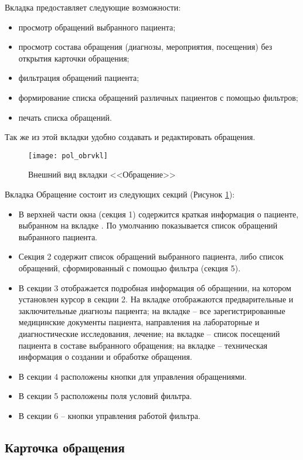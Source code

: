 Вкладка  предоставляет следующие возможности:
\begin{itemize}
 \item просмотр обращений выбранного пациента;
 \item просмотр состава обращения (диагнозы, мероприятия, посещения) без открытия карточки обращения;
 \item фильтрация обращений пациента;
 \item формирование списка обращений различных пациентов с помощью фильтров;
 \item печать списка обращений.
\end{itemize}

Так же из этой вкладки удобно создавать и редактировать обращения.

\begin{figure}[ht]\centering
 \texttt{[image: pol\_obrvkl]}
 \caption{Внешний вид вкладки <<Обращение>>}
 \label{img_pol_obrvkl}
\end{figure}

Вкладка Обращение состоит из следующих секций (Рисунок \ref{img_pol_obrvkl}):
\begin{itemize}
 \item В верхней части окна (секция 1) содержится краткая информация о пациенте, выбранном на вкладке . По умолчанию показывается список обращений выбранного пациента.
 \item Секция 2 содержит список обращений выбранного пациента, либо список обращений, сформированный с помощью фильтра (секция 5).
 \item В секции 3 отображается подробная информация об обращении, на котором установлен курсор в секции 2. На вкладке  отображаются предварительные и заключительные диагнозы пациента; на вкладке  – все зарегистрированные медицинские документы пациента, направления на лабораторные и диагностические исследования, лечение; на вкладке  – список посещений пациента в составе выбранного обращения; на вкладке  – техническая информация о создании и обработке обращения.
 \item В секции 4 расположены кнопки для управления обращениями.
 \item В секции 5 расположены поля условий фильтра.
 \item В секции 6 – кнопки управления работой фильтра.
\end{itemize}

\subsection {Карточка обращения}

